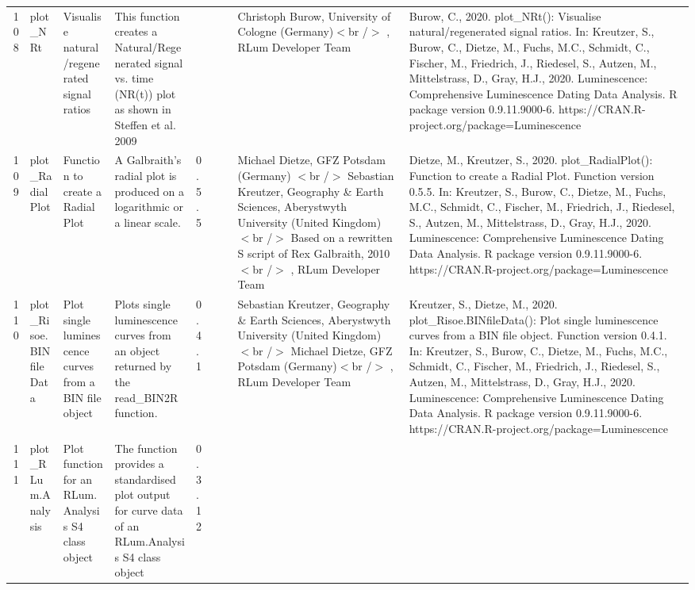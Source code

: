 \begin{table}[ht]
\begin{tabular}{rllllllll}
 \\ 
  108 & plot\_NRt & Visualise natural/regenerated signal ratios & This function creates a Natural/Regenerated signal vs. time (NR(t)) plot as shown in Steffen et al. 2009 &  &  &  & Christoph Burow, University of Cologne (Germany)$<$br /$>$ , RLum Developer Team & Burow, C., 2020. plot\_NRt(): Visualise natural/regenerated signal ratios. In: Kreutzer, S., Burow, C., Dietze, M., Fuchs, M.C., Schmidt, C., Fischer, M., Friedrich, J., Riedesel, S., Autzen, M., Mittelstrass, D., Gray, H.J., 2020. Luminescence: Comprehensive Luminescence Dating Data Analysis. R package version 0.9.11.9000-6. https://CRAN.R-project.org/package=Luminescence
 \\ 
  109 & plot\_RadialPlot & Function to create a Radial Plot & A Galbraith's radial plot is produced on a logarithmic or a linear scale. & 0.5.5
 &  &  & Michael Dietze, GFZ Potsdam (Germany) $<$br /$>$ Sebastian Kreutzer, Geography \& Earth Sciences, Aberystwyth University (United Kingdom) $<$br /$>$ Based on a rewritten S script of Rex Galbraith, 2010$<$br /$>$ , RLum Developer Team & Dietze, M., Kreutzer, S., 2020. plot\_RadialPlot(): Function to create a Radial Plot. Function version 0.5.5. In: Kreutzer, S., Burow, C., Dietze, M., Fuchs, M.C., Schmidt, C., Fischer, M., Friedrich, J., Riedesel, S., Autzen, M., Mittelstrass, D., Gray, H.J., 2020. Luminescence: Comprehensive Luminescence Dating Data Analysis. R package version 0.9.11.9000-6. https://CRAN.R-project.org/package=Luminescence
 \\ 
  110 & plot\_Risoe.BINfileData & Plot single luminescence curves from a BIN file object & Plots single luminescence curves from an object returned by the read\_BIN2R  function. & 0.4.1
 &  &  & Sebastian Kreutzer, Geography \& Earth Sciences, Aberystwyth University (United Kingdom) $<$br /$>$ Michael Dietze, GFZ Potsdam (Germany)$<$br /$>$ , RLum Developer Team & Kreutzer, S., Dietze, M., 2020. plot\_Risoe.BINfileData(): Plot single luminescence curves from a BIN file object. Function version 0.4.1. In: Kreutzer, S., Burow, C., Dietze, M., Fuchs, M.C., Schmidt, C., Fischer, M., Friedrich, J., Riedesel, S., Autzen, M., Mittelstrass, D., Gray, H.J., 2020. Luminescence: Comprehensive Luminescence Dating Data Analysis. R package version 0.9.11.9000-6. https://CRAN.R-project.org/package=Luminescence
 \\ 
  111 & plot\_RLum.Analysis & Plot function for an RLum.Analysis S4 class object & The function provides a standardised plot output for curve data of an RLum.Analysis S4 class object & 0.3.12

\end{tabular}
\end{table}

